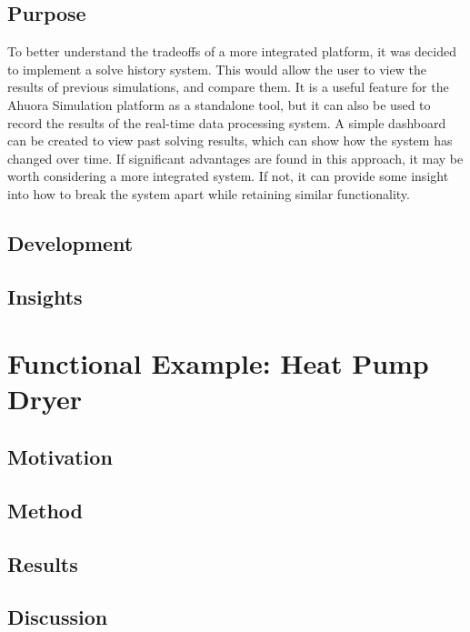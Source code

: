 \documentclass[12pt]{report}
\begin{document}
\section{Purpose}

To better understand the tradeoffs of a more integrated platform, it was decided to implement a solve history system. This would allow the user to view the results of previous simulations, and compare them. It is a useful feature for the Ahuora Simulation platform as a standalone tool, but it can also be used to record the results of the real-time data processing system. A simple dashboard can be created to view past solving results, which can show how the system has changed over time. If significant advantages are found in this approach, it may be worth considering a more integrated system. If not, it can provide some insight into how to break the system apart while retaining similar functionality.


\section{Development}


\section{Insights}




\chapter{Functional Example: Heat Pump Dryer}

\section{Motivation}

\section{Method}

\section{Results}

\section{Discussion}

\end{document}
